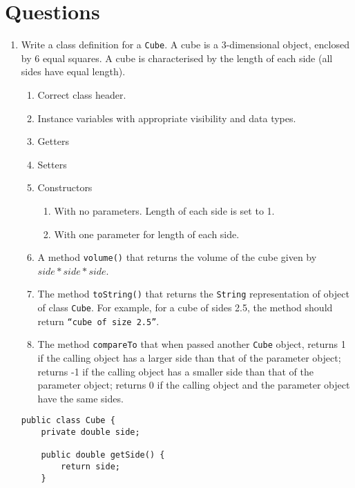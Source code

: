 \section*{Questions}
\begin{questions}

\question 

\begin{enumerate}
\item Write a class definition for a \texttt{Cube}. A cube is a 3-dimensional object, enclosed by 6 equal squares. A cube is characterised by the length of each side (all sides have equal length).

\begin{enumerate}
\item Correct class header.
\item Instance variables with appropriate visibility and data types.
\item Getters
\item Setters
\item Constructors
	\begin{enumerate}
		\item With no parameters. Length of each side is set to 1.
		\item With one parameter for length of each side.
	\end{enumerate}
\item A method \texttt{volume()} that returns the volume of the cube given by $side * side * side$.

\item The method \texttt{toString()} that returns the \texttt{String} representation of object of class \texttt{Cube}. For example, for a cube of sides 2.5, the method should return \texttt{``cube of size 2.5''}.

\item The method \texttt{compareTo} that when passed another \texttt{Cube} object, returns 1 if the calling object has a larger side than that of the parameter object; returns -1 if the calling object has a smaller side than that of the parameter object; returns 0 if the calling object and the parameter object have the same sides.
\end{enumerate}

\begin{solution}
\begin{lstlisting}
public class Cube {
	private double side;

	public double getSide() {
		return side;
	}


\end{lstlisting}
\end{solution}
\end{enumerate}
\end{questions}
